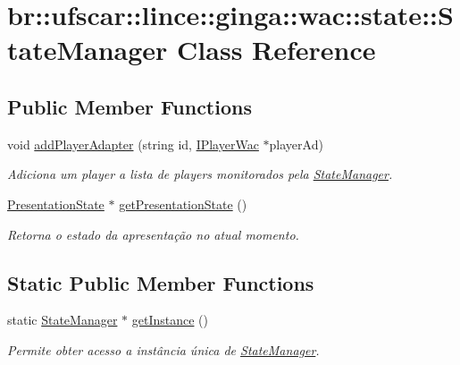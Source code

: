 \hypertarget{classbr_1_1ufscar_1_1lince_1_1ginga_1_1wac_1_1state_1_1StateManager}{
\section{br::ufscar::lince::ginga::wac::state::StateManager Class Reference}
\label{classbr_1_1ufscar_1_1lince_1_1ginga_1_1wac_1_1state_1_1StateManager}
}
\subsection*{Public Member Functions}
\begin{DoxyCompactItemize}
\item 
void \hyperlink{classbr_1_1ufscar_1_1lince_1_1ginga_1_1wac_1_1state_1_1StateManager_ab0b8ca8a349b9fbda4c9960fd72345df}{addPlayerAdapter} (string id, \hyperlink{classbr_1_1ufscar_1_1lince_1_1ginga_1_1wac_1_1state_1_1IPlayerWac}{IPlayerWac} $\ast$playerAd)
\begin{DoxyCompactList}\small\item\em Adiciona um player a lista de players monitorados pela \hyperlink{classbr_1_1ufscar_1_1lince_1_1ginga_1_1wac_1_1state_1_1StateManager}{StateManager}. \item\end{DoxyCompactList}\item 
\hyperlink{classbr_1_1ufscar_1_1lince_1_1ginga_1_1wac_1_1state_1_1PresentationState}{PresentationState} $\ast$ \hyperlink{classbr_1_1ufscar_1_1lince_1_1ginga_1_1wac_1_1state_1_1StateManager_ab7c82f257bf2515985a54e65bf546da5}{getPresentationState} ()
\begin{DoxyCompactList}\small\item\em Retorna o estado da apresentação no atual momento. \item\end{DoxyCompactList}\end{DoxyCompactItemize}
\subsection*{Static Public Member Functions}
\begin{DoxyCompactItemize}
\item 
static \hyperlink{classbr_1_1ufscar_1_1lince_1_1ginga_1_1wac_1_1state_1_1StateManager}{StateManager} $\ast$ \hyperlink{classbr_1_1ufscar_1_1lince_1_1ginga_1_1wac_1_1state_1_1StateManager_a7875cddb02bd5dfa72539234438b3a7e}{getInstance} ()
\begin{DoxyCompactList}\small\item\em Permite obter acesso a instância única de \hyperlink{classbr_1_1ufscar_1_1lince_1_1ginga_1_1wac_1_1state_1_1StateManager}{StateManager}. \item\end{DoxyCompactList}\end{DoxyCompactItemize}


